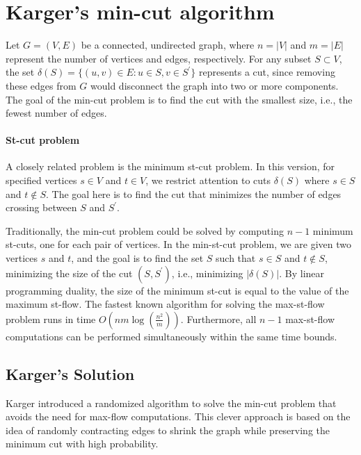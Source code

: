 \section{Karger's min-cut algorithm}


Let $G = (V, E)$ be a connected, undirected graph, where $n = |V|$ and $m = |E|$ represent the number of vertices and edges, respectively. 
For any subset $S \subset V$, the set $\delta(S) = \{(u, v) \in E : u \in S, v \in S^\prime\}$ represents a cut, since removing these edges from $G$ would disconnect the graph into two or more components. 
The goal of the min-cut problem is to find the cut with the smallest size, i.e., the fewest number of edges.

\paragraph*{St-cut problem}
A closely related problem is the minimum st-cut problem. 
In this version, for specified vertices $s \in V$ and $t \in V$, we restrict attention to cuts $\delta(S)$ where $s \in S$ and $t \notin S$. 
The goal here is to find the cut that minimizes the number of edges crossing between $S$ and $S^\prime$.

Traditionally, the min-cut problem could be solved by computing $n - 1$ minimum st-cuts, one for each pair of vertices.
In the min-st-cut problem, we are given two vertices $s$ and $t$, and the goal is to find the set $S$ such that $s \in S$ and $t \notin S$, minimizing the size of the cut $(S, S^\prime)$, i.e., minimizing $|\delta(S)|$.
By linear programming duality, the size of the minimum st-cut is equal to the value of the maximum st-flow. 
The fastest known algorithm for solving the max-st-flow problem runs in time $O(nm \log(\frac{n^2}{m}))$. 
Furthermore, all $n - 1$ max-st-flow computations can be performed simultaneously within the same time bounds.

\subsection{Karger's Solution}
Karger introduced a randomized algorithm to solve the min-cut problem that avoids the need for max-flow computations. 
This clever approach is based on the idea of randomly contracting edges to shrink the graph while preserving the minimum cut with high probability.